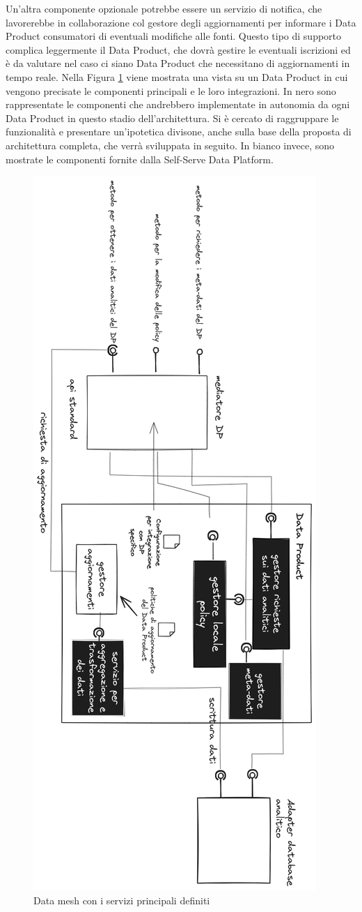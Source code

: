 \documentclass[12pt]{report}
\begin{document}
Un'altra componente opzionale potrebbe essere un servizio di notifica, che lavorerebbe in collaborazione col gestore degli aggiornamenti per informare i Data Product consumatori di eventuali modifiche alle fonti. 
Questo tipo di supporto complica leggermente il Data Product, che dovrà gestire le eventuali iscrizioni ed è da valutare nel caso ci siano Data Product che necessitano di aggiornamenti in tempo reale.
Nella Figura \ref{fig:dp supporto aggiornamenti} viene mostrata una vista su un Data Product in cui vengono precisate le componenti principali e le loro integrazioni.
In nero sono rappresentate le componenti che andrebbero implementate in autonomia da ogni Data Product in questo stadio dell'architettura.
Si è cercato di raggruppare le funzionalità e presentare un'ipotetica divisone, anche sulla base della proposta di architettura completa, che verrà sviluppata in seguito.
In bianco invece, sono mostrate le componenti fornite dalla Self-Serve Data Platform. 
\begin{figure}
    \centering
    \includegraphics[width=0.5\linewidth]{immagini/Data Mesh supporto agli aggiornamenti 2024-03-08 15.55.58.excalidraw.png}
    \caption{Data mesh con i servizi principali definiti}
    \label{fig:dp supporto aggiornamenti}
\end{figure}
\end{document}
